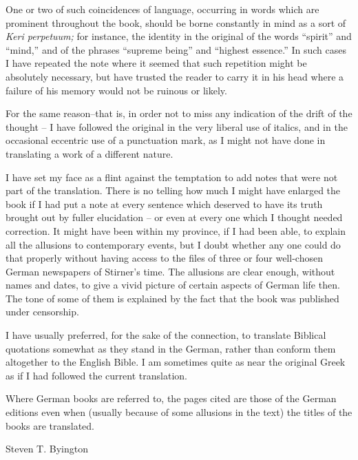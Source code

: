 \documentclass[12pt,a4paper]{book}
\begin{document}
One or two of such coincidences of language, occurring in words which are 
prominent throughout the book, should be borne constantly in mind as a sort of 
\textit{Keri perpetuum;} for instance, the identity in the original of the 
words ``spirit'' and ``mind,'' and of the phrases ``supreme being'' and 
``highest essence.'' In such cases I have repeated the note where it seemed 
that such repetition might be absolutely necessary, but have trusted the 
reader to carry it in his head where a failure of his memory would not be 
ruinous or likely.

For the same reason--that is, in order not to miss any indication of the drift 
of the thought -- I have followed the original in the very liberal use of 
italics, and in the occasional eccentric use of a punctuation mark, as I might 
not have done in translating a work of a different nature.

I have set my face as a flint against the temptation to add notes that were 
not part of the translation. There is no telling how much I might have 
enlarged the book if I had put a note at every sentence which deserved to have 
its truth brought out by fuller elucidation -- or even at every one which I 
thought needed correction. It might have been within my province, if I had 
been able, to explain all the allusions to contemporary events, but I doubt 
whether any one could do that properly without having access to the files of 
three or four well-chosen German newspapers of Stirner's time. The allusions 
are clear enough, without names and dates, to give a vivid picture of certain 
aspects of German life then. The tone of some of them is explained by the fact 
that the book was published under censorship.

I have usually preferred, for the sake of the connection, to translate 
Biblical quotations somewhat as they stand in the German, rather than conform 
them altogether to the English Bible. I am sometimes quite as near the 
original Greek as if I had followed the current translation.

Where German books are referred to, the pages cited are those of the German 
editions even when (usually because of some allusions in the text) the titles 
of the books are translated.

\begin{flushright}
Steven T. Byington\end{flushright}


\newpage{}

~
\end{document}
